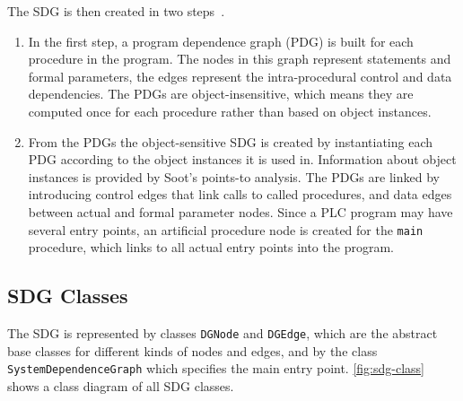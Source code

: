 The SDG is then created in two steps~\cite[ch.~6]{GrimmerDA}.

\begin{enumerate}
  \item In the first step, a program dependence graph (PDG) is built for each procedure in the program. The nodes in 
  this graph represent statements and formal parameters, the edges represent the intra-procedural control and data 
  dependencies. The PDGs are object-insensitive, which means they are computed once for each procedure rather than 
  based on object instances.
  
  \item From the PDGs the object-sensitive SDG is created by instantiating each PDG according to the object instances 
  it is used in. Information about object instances is provided by Soot's points-to analysis. The PDGs are linked by 
  introducing control edges that link calls to called procedures, and data edges between actual and formal parameter 
  nodes. Since a PLC program may have several entry points, an artificial procedure node is created for the 
  \lstinline|main| procedure, which links to all actual entry points into the program.
\end{enumerate}

\subsection{SDG Classes}

The SDG is represented by classes \lstinline|DGNode| and \lstinline|DGEdge|, which are the abstract base classes for 
different kinds of nodes and edges, and by the class \lstinline|SystemDependenceGraph| which specifies the main entry 
point. \autoref{fig:sdg-class} shows a class diagram of all SDG classes.

